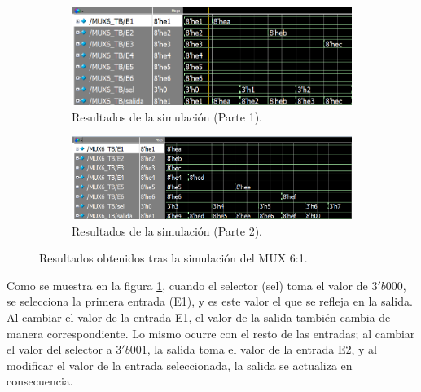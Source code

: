 \documentclass[9pt,technote]{IEEEtran}
\begin{document}
	\begin{figure}[htb]
	\centering
	
	\begin{subfigure}[b]{\columnwidth}
		\centering
		\includegraphics[width=\columnwidth]{Sim_res1_6.png}
		\caption{Resultados de la simulación (Parte 1).}
		\label{fig:MUX6_SIM_RES:1a}
	\end{subfigure}
	
	\vspace{0.5cm} %
	
	\begin{subfigure}[b]{\columnwidth}
		\centering
		\includegraphics[width=\columnwidth]{Sim_res7_14.png}
		\caption{Resultados de la simulación (Parte 2).}
		\label{fig:MUX6_SIM_RES:1b}
	\end{subfigure}
	
	\caption{Resultados obtenidos tras la simulación del MUX 6:1.}
	\label{fig:MUX6_SIM_RES:1}
	\end{figure}

	Como se muestra en la figura \ref{fig:MUX6_SIM_RES:1a}, cuando el selector (sel) toma el valor de $3'b000$, se selecciona la primera entrada (E1), y es este valor el que se refleja en la salida. Al cambiar el valor de la entrada E1, el valor de la salida también cambia de manera correspondiente. Lo mismo ocurre con el resto de las entradas; al cambiar el valor del selector a $3'b001$, la salida toma el valor de la entrada E2, y al modificar el valor de la entrada seleccionada, la salida se actualiza en consecuencia.
\end{document}
